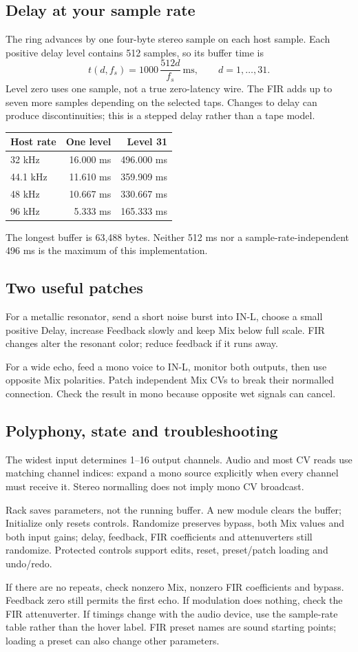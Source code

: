 \subsection{Delay at your sample rate}
The ring advances by one four-byte stereo sample on each host sample. Each
positive delay level contains 512 samples, so its buffer time is
\[
 t(d,f_s)=1000\,\frac{512d}{f_s}\ \mathrm{ms},\qquad d=1,\ldots,31.
\]
Level zero uses one sample, not a true zero-latency wire. The FIR adds up to
seven more samples depending on the selected taps. Changes to delay can
produce discontinuities; this is a stepped delay rather than a tape model.
\begin{center}\begin{tabular}{lrr}\toprule
Host rate & One level & Level 31\\\midrule
32 kHz & 16.000 ms & 496.000 ms\\
44.1 kHz & 11.610 ms & 359.909 ms\\
48 kHz & 10.667 ms & 330.667 ms\\
96 kHz & 5.333 ms & 165.333 ms\\\bottomrule
\end{tabular}\end{center}
The longest buffer is 63,488 bytes. Neither 512 ms nor a sample-rate-independent
496 ms is the maximum of this implementation.
\subsection{Two useful patches}
For a metallic resonator, send a short noise burst into IN-L, choose a small
positive Delay, increase Feedback slowly and keep Mix below full scale.
FIR changes alter the resonant color; reduce feedback if it runs away.

For a wide echo, feed a mono voice to IN-L, monitor both outputs, then use
opposite Mix polarities. Patch independent Mix CVs to break their normalled
connection. Check the result in mono because opposite wet signals can cancel.
\subsection{Polyphony, state and troubleshooting}
The widest input determines 1--16 output channels. Audio and most CV reads
use matching channel indices: expand a mono source explicitly when every
channel must receive it. Stereo normalling does not imply mono CV broadcast.

Rack saves parameters, not the running buffer. A new module clears the
buffer; Initialize only resets controls. Randomize preserves bypass, both
Mix values and both input gains; delay, feedback, FIR coefficients and
attenuverters still randomize. Protected controls support edits, reset,
preset/patch loading and undo/redo.

If there are no repeats, check nonzero Mix, nonzero FIR coefficients and
bypass. Feedback zero still permits the first echo. If modulation does
nothing, check the FIR attenuverter. If timings change with the audio device,
use the sample-rate table rather than the hover label. FIR preset names are
sound starting points; loading a preset can also change other parameters.
